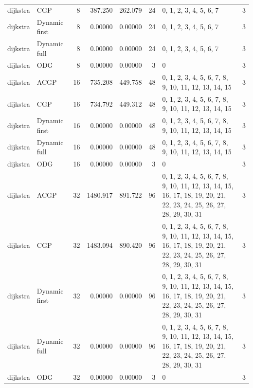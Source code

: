 \documentclass[10pt,a4paper]{article}
\begin{document}
\begin{longtable}{@{}p{23mm}p{29mm}rrrrp{36mm}r@{}}
dijkstra & CGP & 8 & 387.250 & 262.079 & 24 & 0, 1, 2, 3, 4, 5, 6, 7 & 3 \\
dijkstra & Dynamic first & 8 & 0.00000 & 0.00000 & 24 & 0, 1, 2, 3, 4, 5, 6, 7 & 3 \\
dijkstra & Dynamic full & 8 & 0.00000 & 0.00000 & 24 & 0, 1, 2, 3, 4, 5, 6, 7 & 3 \\
dijkstra & ODG & 8 & 0.00000 & 0.00000 & 3 & 0 & 3 \\
dijkstra & ACGP & 16 & 735.208 & 449.758 & 48 & 0, 1, 2, 3, 4, 5, 6, 7, 8, 9, 10, 11, 12, 13, 14, 15 & 3 \\
dijkstra & CGP & 16 & 734.792 & 449.312 & 48 & 0, 1, 2, 3, 4, 5, 6, 7, 8, 9, 10, 11, 12, 13, 14, 15 & 3 \\
dijkstra & Dynamic first & 16 & 0.00000 & 0.00000 & 48 & 0, 1, 2, 3, 4, 5, 6, 7, 8, 9, 10, 11, 12, 13, 14, 15 & 3 \\
dijkstra & Dynamic full & 16 & 0.00000 & 0.00000 & 48 & 0, 1, 2, 3, 4, 5, 6, 7, 8, 9, 10, 11, 12, 13, 14, 15 & 3 \\
dijkstra & ODG & 16 & 0.00000 & 0.00000 & 3 & 0 & 3 \\
dijkstra & ACGP & 32 & 1480.917 & 891.722 & 96 & 0, 1, 2, 3, 4, 5, 6, 7, 8, 9, 10, 11, 12, 13, 14, 15, 16, 17, 18, 19, 20, 21, 22, 23, 24, 25, 26, 27, 28, 29, 30, 31 & 3 \\
dijkstra & CGP & 32 & 1483.094 & 890.420 & 96 & 0, 1, 2, 3, 4, 5, 6, 7, 8, 9, 10, 11, 12, 13, 14, 15, 16, 17, 18, 19, 20, 21, 22, 23, 24, 25, 26, 27, 28, 29, 30, 31 & 3 \\
dijkstra & Dynamic first & 32 & 0.00000 & 0.00000 & 96 & 0, 1, 2, 3, 4, 5, 6, 7, 8, 9, 10, 11, 12, 13, 14, 15, 16, 17, 18, 19, 20, 21, 22, 23, 24, 25, 26, 27, 28, 29, 30, 31 & 3 \\
dijkstra & Dynamic full & 32 & 0.00000 & 0.00000 & 96 & 0, 1, 2, 3, 4, 5, 6, 7, 8, 9, 10, 11, 12, 13, 14, 15, 16, 17, 18, 19, 20, 21, 22, 23, 24, 25, 26, 27, 28, 29, 30, 31 & 3 \\
dijkstra & ODG & 32 & 0.00000 & 0.00000 & 3 & 0 & 3 \\
\end{longtable}\normalsize\setlength{\tabcolsep}{6pt}
\clearpage
\end{document}
